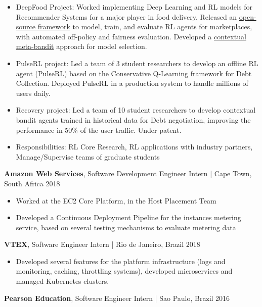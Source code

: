 \documentclass[11pt,letter,sans,colorlinks,linkcolor=true]{moderncv}
\begin{document}
          \begin{itemize}
\item[\textbullet]{DeepFood Project: Worked implementing Deep Learning and RL models for Recommender Systems for a major player in food delivery. Released an \href{https://arxiv.org/abs/2010.07035}{open-source framework} to model, train, and evaluate RL agents for marketplaces, with automated off-policy and fairness evaluation. Developed a \href{https://dl.acm.org/doi/10.1145/3383313.3412209}{contextual meta-bandit} approach for model selection.}\item[\textbullet]{PulseRL project: Led a team of 3 student researchers to develop an offline RL agent (\href{https://api.semanticscholar.org/CorpusID:249703190}{PulseRL}) based on the Conservative Q-Learning framework for Debt Collection. Deployed PulseRL in a production system to handle millions of users daily.}\item[\textbullet]{Recovery project: Led a team of 10 student researchers to develop contextual bandit agents trained in historical data for Debt negotiation, improving the performance in 50\% of the user traffic. Under patent.}\item[\textbullet]{Responsibilities: RL Core Research, RL applications with industry partners, Manage/Supervise teams of graduate students}\end{itemize}
      \textbf{Amazon Web Services},
      Software Development Engineer Intern |
      Cape Town, South Africa
      \hfill 2018 \par
          \begin{itemize}
\item[\textbullet]{Worked at the EC2 Core Platform, in the Host Placement Team}\item[\textbullet]{Developed a Continuous Deployment Pipeline for the instances metering service, based on several testing mechanisms to evaluate metering data}\end{itemize}
      \textbf{VTEX},
      Software Engineer Intern |
      Rio de Janeiro, Brazil
      \hfill 2018 \par
          \begin{itemize}
\item[\textbullet]{Developed several features for the platform infrastructure (logs and monitoring, caching, throttling systems), developed microservices and managed Kubernetes clusters.}\end{itemize}
      \textbf{Pearson Education},
      Software Engineer Intern |
      Sao Paulo, Brazil
      \hfill 2016 \par
\end{document}
